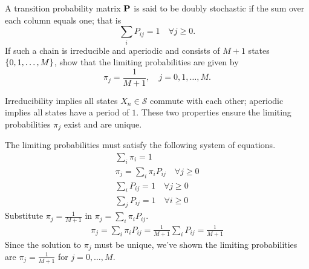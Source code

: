 \documentclass{article}
\begin{document}
    \nextproblem

    \begin{problem}
        A transition probability matrix $\vb{P}$ is said to be doubly stochastic if the sum over each column equals one; that is 
        \begin{equation}
            \sum_i P_{ij} = 1 \quad \forall j \geq 0.
        \end{equation}
        If such a chain is irreducible and aperiodic and consists of $M + 1$ states $\{0, 1, \ldots, M\}$, show that the limiting probabilities are given by
        \begin{equation}
            \pi_j = \frac{1}{M + 1}, \quad j = 0, 1, \ldots, M.
        \end{equation}
    \end{problem}

    \begin{solution}
        Irreducibility implies all states $X_n \in \mathcal{S}$ commute with each other; aperiodic implies all states have a period of $1$. These two properties ensure the limiting probabilities $\pi_j$ exist and are unique.

        The limiting probabilities must satisfy the following system of equations. 
        \begin{gather*}
            \sum_i \pi_i = 1 \\
            \pi_j = \sum_i \pi_i P_{ij} \quad \forall j \geq 0 \\
            \sum_i P_{ij} = 1 \quad \forall j \geq 0 \\
            \sum_j P_{ij} = 1 \quad \forall i \geq 0
        \end{gather*}
        Substitute $\pi_j = \frac{1}{M + 1}$ in $\pi_j = \sum_i \pi_i P_{ij}$.
        \begin{gather*}
            \pi_j = \sum_i \pi_i P_{ij} = \frac{1}{M + 1} \sum_i P_{ij} = \frac{1}{M + 1}
        \end{gather*}
        Since the solution to $\pi_j$ must be unique, we've shown the limiting probabilities are $\pi_j = \frac{1}{M + 1}$ for $j = 0,\ldots, M$.
        
    \end{solution}

    \nextproblem
\end{document}
